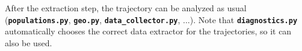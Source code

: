\documentclass[a4paper,11pt,DIV=15,openany]{scrbook}
\newcommand{\ttt}[1]{\textbf{\texttt{#1}}}
\begin{document}
After the extraction step, the trajectory can be analyzed as usual (\ttt{populations.py}, \ttt{geo.py}, \ttt{data\_collector.py}, ...).
Note that \ttt{diagnostics.py} automatically chooses the correct data extractor for the trajectories, so it can also be used.


\end{document}
